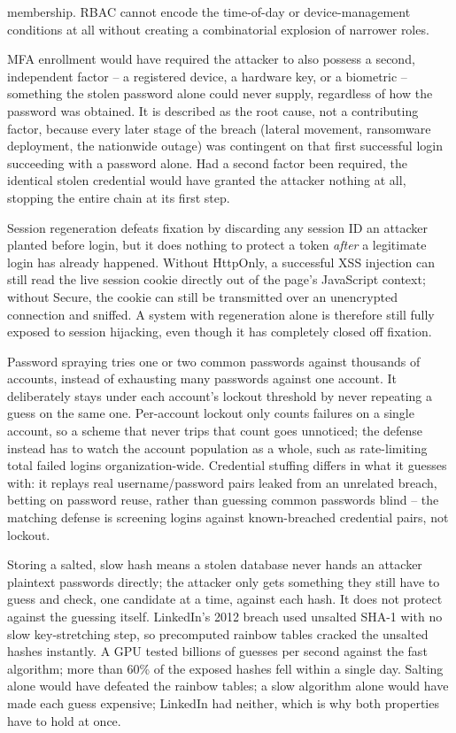 \begin{answerkey}
membership. RBAC cannot encode the time-of-day or device-management conditions at all without
creating a combinatorial explosion of narrower roles.
\item MFA enrollment would have required the attacker to also possess a second, independent
factor -- a registered device, a hardware key, or a biometric -- something the stolen password
alone could never supply, regardless of how the password was obtained. It is described as the root
cause, not a contributing factor, because every later stage of the breach (lateral movement,
ransomware deployment, the nationwide outage) was contingent on that first successful login
succeeding with a password alone. Had a second factor been required, the identical stolen
credential would have granted the attacker nothing at all, stopping the entire chain at its first
step.
\item Session regeneration defeats fixation by discarding any session ID an attacker planted
before login, but it does nothing to protect a token \emph{after} a legitimate login has already
happened. Without HttpOnly, a successful XSS injection can still read the live session cookie
directly out of the page's JavaScript context; without Secure, the cookie can still be transmitted
over an unencrypted connection and sniffed. A system with regeneration alone is therefore still
fully exposed to session hijacking, even though it has completely closed off fixation.
\item Password spraying tries one or two common passwords against thousands of accounts, instead of
exhausting many passwords against one account. It deliberately stays under each account's lockout
threshold by never repeating a guess on the same one. Per-account lockout only counts failures on a
single account, so a scheme that never trips that count goes unnoticed; the defense instead has to
watch the account population as a whole, such as rate-limiting total failed logins organization-wide.
Credential stuffing differs in what it guesses with: it replays real username/password pairs leaked
from an unrelated breach, betting on password reuse, rather than guessing common passwords blind --
the matching defense is screening logins against known-breached credential pairs, not lockout.
\item Storing a salted, slow hash means a stolen database never hands an attacker plaintext
passwords directly; the attacker only gets something they still have to guess and check, one
candidate at a time, against each hash. It does not protect against the guessing itself. LinkedIn's
2012 breach used unsalted SHA-1 with no slow key-stretching step, so precomputed rainbow tables
cracked the unsalted hashes instantly. A GPU tested billions of guesses per second against the fast
algorithm; more than 60\% of the exposed hashes fell within a single day. Salting alone would
have defeated the rainbow tables; a slow algorithm alone would have made each guess expensive;
LinkedIn had neither, which is why both properties have to hold at once.
\end{answerkey}

